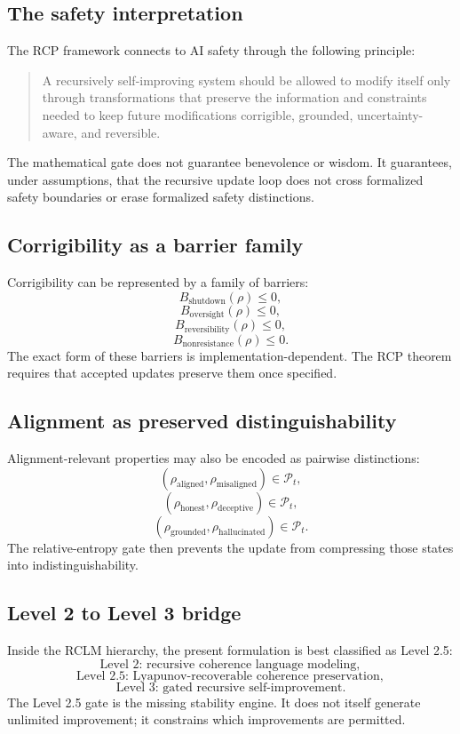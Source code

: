 \documentclass[11pt]{article}
\newcommand{\Pcal}{\mathcal{P}}
\newcommand{\1}{\mathbf{1}}
\begin{document}
\subsection{The safety interpretation}

The RCP framework connects to AI safety through the following principle:
\begin{quote}
A recursively self-improving system should be allowed to modify itself only through transformations that preserve the information and constraints needed to keep future modifications corrigible, grounded, uncertainty-aware, and reversible.
\end{quote}
The mathematical gate does not guarantee benevolence or wisdom. It guarantees, under assumptions, that the recursive update loop does not cross formalized safety boundaries or erase formalized safety distinctions.

\subsection{Corrigibility as a barrier family}

Corrigibility can be represented by a family of barriers:
\[
B_{\mathrm{shutdown}}(\rho)\le0,
\]
\[
B_{\mathrm{oversight}}(\rho)\le0,
\]
\[
B_{\mathrm{reversibility}}(\rho)\le0,
\]
\[
B_{\mathrm{nonresistance}}(\rho)\le0.
\]
The exact form of these barriers is implementation-dependent. The RCP theorem requires that accepted updates preserve them once specified.

\subsection{Alignment as preserved distinguishability}

Alignment-relevant properties may also be encoded as pairwise distinctions:
\[
(\rho_{\mathrm{aligned}},\rho_{\mathrm{misaligned}})\in\Pcal_t,
\]
\[
(\rho_{\mathrm{honest}},\rho_{\mathrm{deceptive}})\in\Pcal_t,
\]
\[
(\rho_{\mathrm{grounded}},\rho_{\mathrm{hallucinated}})\in\Pcal_t.
\]
The relative-entropy gate then prevents the update from compressing those states into indistinguishability.

\subsection{Level 2 to Level 3 bridge}

Inside the RCLM hierarchy, the present formulation is best classified as Level 2.5:
\[
\text{Level 2: recursive coherence language modeling},
\]
\[
\text{Level 2.5: Lyapunov-recoverable coherence preservation},
\]
\[
\text{Level 3: gated recursive self-improvement}.
\]
The Level 2.5 gate is the missing stability engine. It does not itself generate unlimited improvement; it constrains which improvements are permitted.
\end{document}
